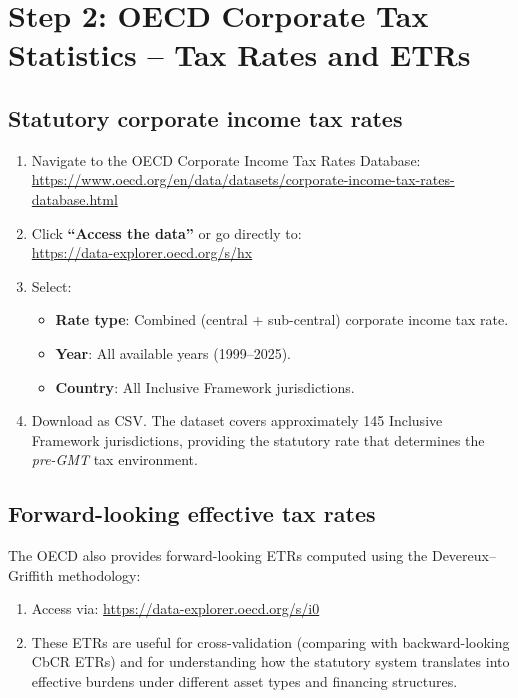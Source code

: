 \documentclass[12pt,a4paper]{article}
\begin{document}
\section{Step 2: OECD Corporate Tax Statistics -- Tax Rates and ETRs}\label{sec:taxrates}

\subsection{Statutory corporate income tax rates}

\begin{enumerate}
\item Navigate to the OECD Corporate Income Tax Rates Database:\\
\url{https://www.oecd.org/en/data/datasets/corporate-income-tax-rates-database.html}

\item Click \textbf{``Access the data''} or go directly to:\\
\url{https://data-explorer.oecd.org/s/hx}

\item Select:
\begin{itemize}
    \item \textbf{Rate type}: Combined (central + sub-central) corporate income tax rate.
    \item \textbf{Year}: All available years (1999--2025).
    \item \textbf{Country}: All Inclusive Framework jurisdictions.
\end{itemize}

\item Download as CSV.
The dataset covers approximately 145 Inclusive Framework jurisdictions, providing the statutory rate that determines the \emph{pre-GMT} tax environment.
\end{enumerate}

\subsection{Forward-looking effective tax rates}

The OECD also provides forward-looking ETRs computed using the Devereux--Griffith methodology:

\begin{enumerate}
\item Access via: \url{https://data-explorer.oecd.org/s/i0}
\item These ETRs are useful for cross-validation (comparing with backward-looking CbCR ETRs) and for understanding how the statutory system translates into effective burdens under different asset types and financing structures.
\end{enumerate}
\end{document}
